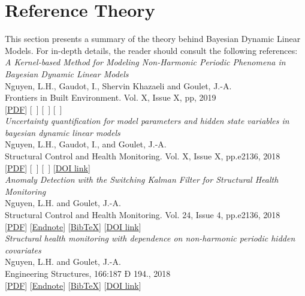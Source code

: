 \section{Reference Theory}
This section presents a summary of the theory behind Bayesian Dynamic Linear Models. For in-depth details, the reader should consult the following references:\\[4pt]

\noindent \emph{A Kernel-based Method for Modeling Non-Harmonic Periodic Phenomena in Bayesian Dynamic Linear Models}\\{\small
            Nguyen, L.H., Gaudot, I., Shervin Khazaeli and Goulet, J.-A.\\
            Frontiers in Built Environment. Vol. X, Issue X, pp, 2019\\}
      [\href{https://www.polymtl.ca/cgm/jagoulet/Site/Papers/Nguyen_et_al_KR_BDLM_2019.pdf}{PDF}] [~]  [~] [~] \cite{Nguyen2019KRBDLM}\\[4pt]

\noindent \emph{Uncertainty quantification for model parameters and hidden state variables in bayesian dynamic linear models}\\{\small
            Nguyen, L.H., Gaudot, I., and Goulet, J.-A.\\
            Structural Control and Health Monitoring. Vol. X, Issue X, pp.e2136, 2018\\}
      [\href{https://www.polymtl.ca/cgm/jagoulet/Site/Papers/Nguyen_Gaudot_Goulet_MCMC_BDLM_2018.pdf}{PDF}] [~]  [~] [\href{https://doi.org/10.1002/stc.2309}{DOI link}] \cite{Nguyen2018UncertaintyBDLM}\\[4pt]
      
      \noindent \emph{Anomaly Detection with the Switching Kalman Filter for Structural Health Monitoring}\\{\small
            Nguyen, L.H. and Goulet, J.-A.\\
            Structural Control and Health Monitoring. Vol. 24, Issue 4, pp.e2136, 2018\\}
      [\href{https://www.polymtl.ca/cgm/jagoulet/Site/Papers/2017_Nguyen_and_Goulet_AD-SKF.pdf}{PDF}] [\href{https://www.polymtl.ca/cgm/jagoulet/Site/Papers/Nguyen_SKF_2018.xml}{Endnote}]  [\href{https://www.polymtl.ca/cgm/jagoulet/Site/Papers/Nguyen_SKF_2018.ris}{BibTeX}] [\href{https://doi.org/10.1002/stc.2136}{DOI link}] \cite{Nguyen2018}\\[4pt]

\noindent \emph{Structural health monitoring with dependence on non-harmonic periodic hidden covariates}\\{\small
            Nguyen, L.H. and Goulet, J.-A.\\
            Engineering Structures, 166:187 Ð 194., 2018\\}
      [\href{https://www.polymtl.ca/cgm/jagoulet/Site/Papers/2018_Nguyen_et_Goulet_SHMHNHC.pdf}{PDF}] [\href{https://www.polymtl.ca/cgm/jagoulet/Site/Papers/2018_Nguyen_et_Goulet_HNHC.xml}{Endnote}]  [\href{https://www.polymtl.ca/cgm/jagoulet/Site/Papers/2018_Nguyen_et_Goulet_HNHC.bib}{BibTeX}] [\href{https://doi.org/10.1016/j.engstruct.2018.03.080}{DOI link}] \cite{Nguyen2018187}\\[4pt]

